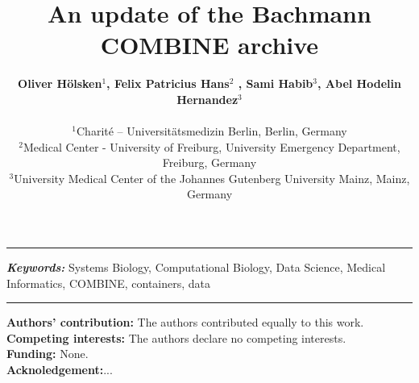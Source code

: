 \documentclass[a4paper, 12pt]{article}
\title{An update of the Bachmann COMBINE archive}
\date{} %
\newcommand\orcidicon[1]{\href{https://orcid.org/#1}{\mbox{\scalerel*{
\begin{tikzpicture}[yscale=-1,transform shape]
\pic{orcidlogo};
\end{tikzpicture}
}{|}}}}
\providecommand{\keywords}[1]
{
  \small	
  \textbf{\textit{Keywords: }} #1
}
\begin{document}
\maketitle

  \noindent\author{\textbf{Oliver H\"olsken$^{1}$, Felix Patricius Hans$^{2}$ %
  , Sami Habib$^{3}$, Abel Hodelin Hernandez$^{3}$} \\ \\
	\small $^{1}$Charité – Universitätsmedizin Berlin, Berlin, Germany \\
	\small $^{2}$Medical Center - University of Freiburg, University Emergency Department, Freiburg, Germany \\
	\small $^{3}$University Medical Center of the Johannes Gutenberg University Mainz, Mainz, Germany \\
}
\hrule

 \hspace{10pt}

\keywords{Systems Biology, Computational Biology, Data Science, Medical Informatics, COMBINE, containers, data}

\hrule

\newpage








\noindent\small \textbf{Authors' contribution:} The authors contributed equally to this work. \\ 
\noindent\small \textbf{Competing interests:} The authors declare no competing interests.\\
\noindent\small \textbf{Funding:} None.\\
\noindent\small \textbf{Acknoledgement:}...



\nocite{*}           %
\printbibliography 
\end{document}
